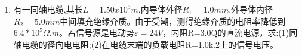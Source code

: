 
\begin{enumerate}
\item 有一同轴电缆,其长$L=1.50x10^3m$,内导体外径$R_1=1.0mm$,外导体内径$R_2=5.0mm$中间填充绝缘介质。由于受潮，测得绝缘介质的电阻率降低到$6.4*10^5\Omega .m$。若信号源是电动势$\varepsilon=24V$，内阻R=3.0Q的直流电源，求:(1)同轴电缆的径向电电阻;(2)在电缆末端的负载电阻R=1.0k.2上的信号电压。
\end{enumerate}